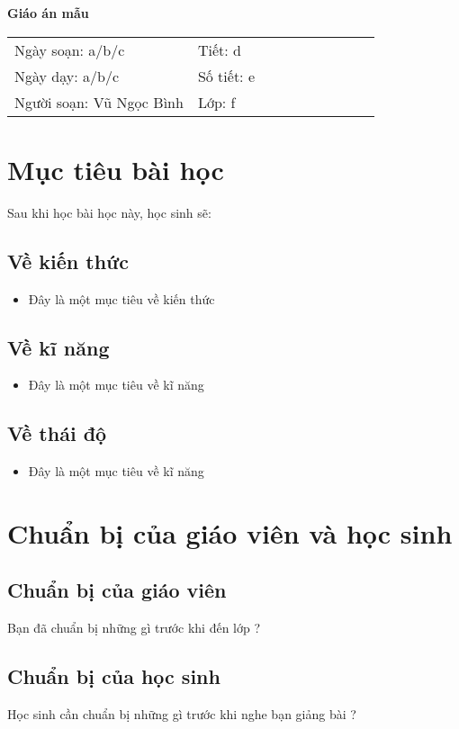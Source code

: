 \documentclass[12pt,a4paper]{article}
\author{Vũ Ngọc Binh}
\begin{document}
	\begin{center}
		\textbf{\LARGE Giáo án mẫu}
	\end{center}
	\begin{tabular}{ m{0.5\linewidth} m{0.5\linewidth} }
		Ngày soạn: a/b/c
		& 
		Tiết: d
		\\
		Ngày dạy: a/b/c
		& 
		Số tiết: e
		\\
		Người soạn: Vũ Ngọc Bình
		& 
		Lớp: f
		\\
	\end{tabular}
	\section{Mục tiêu bài học}
	Sau khi học bài học này, học sinh sẽ:
	\subsection{Về kiến thức}
	\begin{itemize}
		\item Đây là một mục tiêu về kiến thức
	\end{itemize}
	\subsection{Về kĩ năng}
	\begin{itemize}
		\item Đây là một mục tiêu về kĩ năng
	\end{itemize}
	\subsection{Về thái độ}
	\begin{itemize}
		\item Đây là một mục tiêu về kĩ năng
	\end{itemize}
	\section{Chuẩn bị của giáo viên và học sinh}
	\subsection{Chuẩn bị của giáo viên}
	Bạn đã chuẩn bị những gì trước khi đến lớp ?
	\subsection{Chuẩn bị của học sinh}
	Học sinh cần chuẩn bị những gì trước khi nghe bạn giảng bài ?
\end{document}

